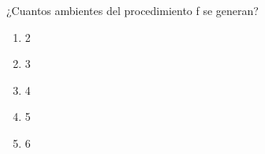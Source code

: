 {
¿Cuantos ambientes del procedimiento f se generan?
\begin{enumerate}
	\item 2
	\item 3
	\item 4 %
	\item 5
	\item 6
\end{enumerate}
}
